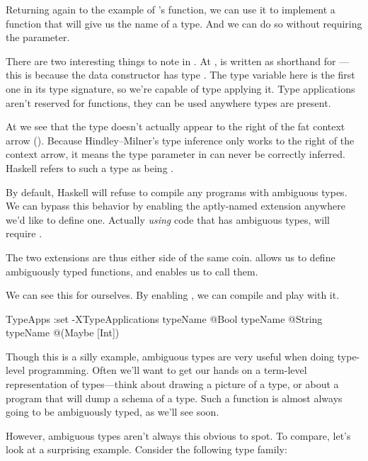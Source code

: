 \documentclass[book.tex]{subfiles}
\begin{document}
Returning again to the example of 's  function, we
can use it to implement a function that will give us the name of a type. And we
can do so without requiring the  parameter.


There are two interesting things to note in . At ,  is written as shorthand for ---this is because the
 data constructor has type . The type variable  here
is the first one in its type signature, so we're capable of type applying it.
Type applications aren't reserved for functions, they can be used anywhere types
are present.

At  we see that the type  doesn't actually appear to the right of
the fat context arrow (\hs{=>}). Because Hindley--Milner's type inference only
works to the right of the context arrow, it means the type parameter  in
 can never be correctly inferred. Haskell refers to such a type as
being .

By default, Haskell will refuse to compile any programs with ambiguous types. We
can bypass this behavior by enabling the aptly-named 
extension anywhere we'd like to define one. Actually \emph{using} code that
has ambiguous types, will require .

The two extensions are thus either side of the same coin.
 allows us to define ambiguously typed functions, and
 enables us to call them.

We can see this for ourselves. By enabling , we can
compile  and play with it.

\begin{dorepl}{TypeApps}
:set -XTypeApplications
typeName @Bool
typeName @String
typeName @(Maybe [Int])
\end{dorepl}

Though this is a silly example, ambiguous types are very useful when doing
type-level programming. Often we'll want to get our hands on a term-level
representation of types---think about drawing a picture of a type, or about a
program that will dump a schema of a type. Such a function is almost always
going to be ambiguously typed, as we'll see soon.

However, ambiguous types aren't always this obvious to spot. To compare, let's
look at a surprising example. Consider the following type family:
\end{document}
